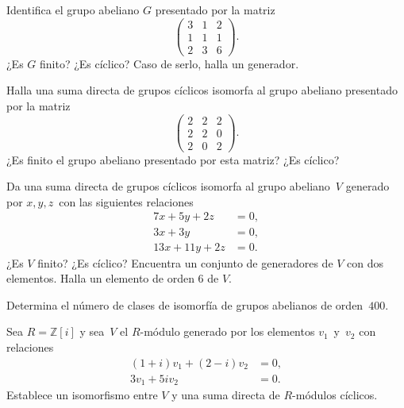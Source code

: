 \documentclass[12pt]{article}
\begin{document}
    \begin{exercise}[14.5.2]
        Identifica el grupo abeliano $G$ presentado por la matriz
        \[
            \begin{pmatrix}
                3&1&2\\
                1&1&1\\
                2&3&6
            \end{pmatrix}.
        \]
        ¿Es $G$ finito? ¿Es cíclico? Caso de serlo, halla un generador.
    \end{exercise}
    
    
    
    
    \begin{exercise}[14.7.1]
        Halla una suma directa de grupos cíclicos isomorfa al grupo abeliano presentado por la matriz 
        \[
            \begin{pmatrix}
                2&2&2\\
                2&2&0\\
                2&0&2
            \end{pmatrix}.
        \]
        ¿Es finito el grupo abeliano presentado por esta matriz? ¿Es cíclico?
    \end{exercise}
    
    \begin{exercise}[14.7.3.d]
        Da una suma directa de grupos cíclicos isomorfa al grupo abeliano~$V$ generado por $x,y,z$~con las siguientes relaciones
        \[
            \begin{aligned}
                7x+5y+2z&=0,\\
                3x+3y&=0,\\
                13x+11y+2z&=0.
            \end{aligned}
        \]
        ¿Es $V$ finito? ¿Es cíclico? Encuentra un conjunto de generadores de $V$ con dos elementos. Halla un elemento de orden $6$ de $V$.
    \end{exercise}
    
    \begin{exercise}[14.7.5]
        Determina el número de clases de isomorfía de grupos abelianos de orden~$400$.
    \end{exercise}
    
    
    \begin{exercise}[14.7.7]
        Sea $R=\mathbb{Z}[i]$ y sea~$V$ el $R$-módulo generado por los elementos $v_{1}$~y~$v_{2}$ con relaciones
        \[
            \begin{aligned}
                (1+i)v_{1}+(2-i)v_{2}&=0,\\
                3v_{1}+5iv_{2}&=0.
            \end{aligned}
        \]
        Establece un isomorfismo entre $V$ y una suma directa de $R$-módulos cíclicos.
    \end{exercise}
    
\end{document}
